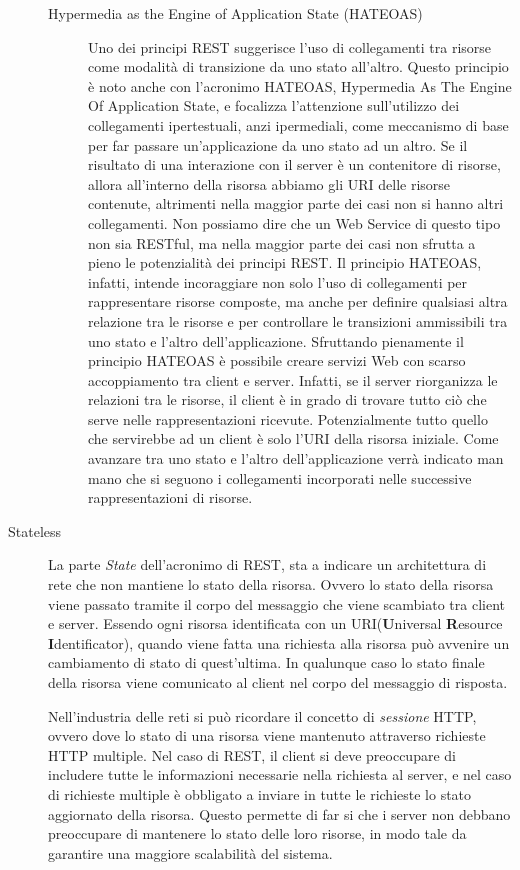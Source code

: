 \begin{description}
\begin{description}
\item[Hypermedia as the Engine of Application State (HATEOAS)] 
\label{itm:hateoas}
Uno dei principi REST suggerisce l'uso di collegamenti tra risorse come modalità di transizione da uno stato all'altro. Questo principio è noto anche con l'acronimo HATEOAS, Hypermedia As The Engine Of Application State, e focalizza l'attenzione sull'utilizzo dei collegamenti ipertestuali, anzi ipermediali, come meccanismo di base per far passare un'applicazione da uno stato ad un altro.
Se il risultato di una interazione con il server è un contenitore di risorse, allora all’interno della risorsa abbiamo gli URI delle risorse contenute, altrimenti nella maggior parte dei casi non si hanno altri collegamenti. Non possiamo dire che un Web Service di questo tipo non sia RESTful, ma nella maggior parte dei casi non sfrutta a pieno le potenzialità dei principi REST.
Il principio HATEOAS, infatti, intende incoraggiare non solo l’uso di collegamenti per rappresentare risorse composte, ma anche per definire qualsiasi altra relazione tra le risorse e per controllare le transizioni ammissibili tra uno stato e l’altro dell’applicazione.
Sfruttando pienamente il principio HATEOAS è possibile creare servizi Web con scarso accoppiamento tra client e server. Infatti, se il server riorganizza le relazioni tra le risorse, il client è in grado di trovare tutto ciò che serve nelle rappresentazioni ricevute. Potenzialmente tutto quello che servirebbe ad un client è solo l’URI della risorsa iniziale. Come avanzare tra uno stato e l’altro dell’applicazione verrà indicato man mano che si seguono i collegamenti incorporati nelle successive rappresentazioni di risorse.
\hspace*{\fill}\cite{web:hateoas}
\end{description}


\item[Stateless]

La parte \emph{State} dell'acronimo di REST, sta a indicare un architettura di rete che non mantiene lo stato della risorsa. Ovvero lo stato della risorsa viene passato tramite il corpo del messaggio che viene scambiato tra client e server. Essendo ogni risorsa identificata con un URI(\textbf{U}niversal \textbf{R}esource \textbf{I}dentificator), quando viene fatta una richiesta alla risorsa può avvenire un cambiamento di stato di quest'ultima. In qualunque caso lo stato finale della risorsa viene comunicato al client nel corpo del messaggio di risposta.

Nell'industria delle reti si può ricordare il concetto di \emph{sessione} HTTP, ovvero dove lo stato di una risorsa viene mantenuto attraverso richieste HTTP multiple. Nel caso di REST, il client si deve preoccupare di includere tutte le informazioni necessarie nella richiesta al server, e nel caso di richieste multiple è obbligato a inviare in tutte le richieste lo stato aggiornato della risorsa. Questo permette di far si che i server non debbano preoccupare di mantenere lo stato delle loro risorse, in modo tale da garantire una maggiore scalabilità del sistema.


\end{description}
